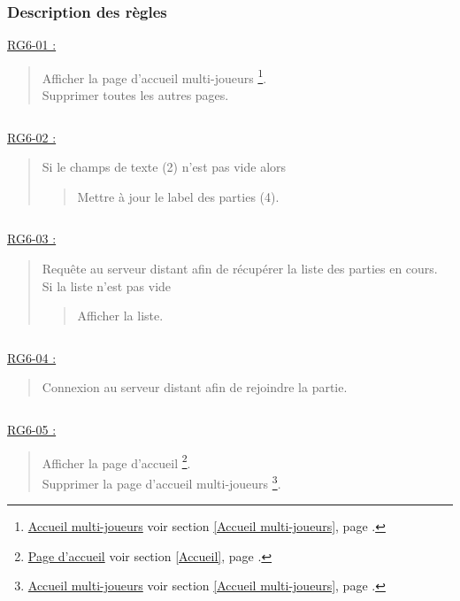 \documentclass{report}
\begin{document}
		\subsubsection{Description des règles}

			\underline{RG6-01 :}
				\begin{quote}
					Afficher la page d'accueil multi-joueurs%
					\footnote[1]{
						\hyperlink{Accueil multi-joueurs}{Accueil multi-joueurs}
						\og voir section \ref{Accueil multi-joueurs}, page \pageref{Accueil multi-joueurs}.\fg
					}.\\
					Supprimer toutes les autres pages.
				\end{quote}

			$\,$

			\underline{RG6-02 :}
				\begin{quote}
					Si le champs de texte (2) n'est pas vide alors
					\begin{quote}	
						Mettre à jour le label des parties (4).
					\end{quote}					
				\end{quote}	
		
			$\,$
				
			\underline{RG6-03 :}
				\begin{quote}
					Requête au serveur distant afin de récupérer la liste des parties en cours.\\
					Si la liste n'est pas vide
					\begin{quote}
						Afficher la liste.
					\end{quote}								
				\end{quote}

			$\,$
				
			\underline{RG6-04 :}
				\begin{quote}
					Connexion au serveur distant afin de rejoindre la partie.
				\end{quote}

			$\,$
				
			\underline{RG6-05 :}
				\begin{quote}
					Afficher la page d'accueil%
						\footnote[1]{
							\hyperlink{Page d'accueil}{Page d'accueil}
							\og voir section \ref{Accueil}, page \pageref{Accueil}.\fg
						}.\\
					Supprimer la page d'accueil multi-joueurs%
						\footnote[2]{
							\hyperlink{Accueil multi-joueurs}{Accueil multi-joueurs}
							\og voir section \ref{Accueil multi-joueurs}, page \pageref{Accueil multi-joueurs}.\fg
						}.
				\end{quote}
\end{document}

